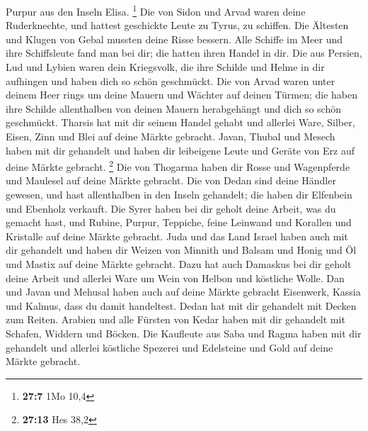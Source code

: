 Purpur aus den Inseln Elisa. \footnote{\textbf{27:7} 1Mo 10,4}
 Die von Sidon und Arvad waren deine Ruderknechte, und
hattest geschickte Leute zu Tyrus, zu schiffen.  Die
Ältesten und Klugen von Gebal mussten deine Risse bessern. Alle Schiffe
im Meer und ihre Schiffsleute fand man bei dir; die hatten ihren Handel
in dir.  Die aus Persien, Lud und Lybien waren dein
Kriegsvolk, die ihre Schilde und Helme in dir aufhingen und haben dich
so schön geschmückt.  Die von Arvad waren unter deinem
Heer rings um deine Mauern und Wächter auf deinen Türmen; die haben ihre
Schilde allenthalben von deinen Mauern herabgehängt und dich so schön
geschmückt.  Tharsis hat mit dir seinem Handel gehabt und
allerlei Ware, Silber, Eisen, Zinn und Blei auf deine Märkte gebracht.
 Javan, Thubal und Mesech haben mit dir gehandelt und
haben dir leibeigene Leute und Geräte von Erz auf deine Märkte gebracht.
\footnote{\textbf{27:13} Hes 38,2}  Die von Thogarma
haben dir Rosse und Wagenpferde und Maulesel auf deine Märkte gebracht.
 Die von Dedan sind deine Händler gewesen, und hast
allenthalben in den Inseln gehandelt; die haben dir Elfenbein und
Ebenholz verkauft.  Die Syrer haben bei dir geholt deine
Arbeit, was du gemacht hast, und Rubine, Purpur, Teppiche, feine
Leinwand und Korallen und Kristalle auf deine Märkte gebracht.
 Juda und das Land Israel haben auch mit dir gehandelt
und haben dir Weizen von Minnith und Balsam und Honig und Öl und Mastix
auf deine Märkte gebracht.  Dazu hat auch Damaskus bei
dir geholt deine Arbeit und allerlei Ware um Wein von Helbon und
köstliche Wolle.  Dan und Javan und Mehusal haben auch
auf deine Märkte gebracht Eisenwerk, Kassia und Kalmus, dass du damit
handeltest.  Dedan hat mit dir gehandelt mit Decken zum
Reiten.  Arabien und alle Fürsten von Kedar haben mit dir
gehandelt mit Schafen, Widdern und Böcken.  Die Kaufleute
aus Saba und Ragma haben mit dir gehandelt und allerlei köstliche
Spezerei und Edelsteine und Gold auf deine Märkte gebracht.


